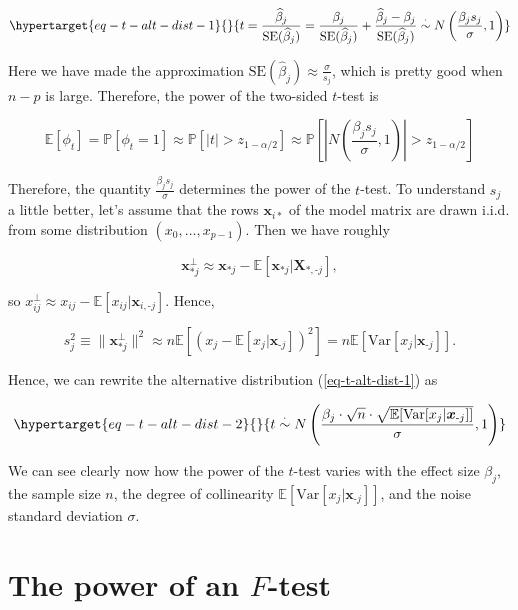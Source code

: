 \documentclass[
  11pt,
  letterpaper,
  oneside]{book}
\theoremstyle{definition}
\theoremstyle{plain}
\theoremstyle{plain}
\theoremstyle{plain}
\theoremstyle{remark}
\begin{document}
\begin{equation}\protect\hypertarget{eq-t-alt-dist-1}{}{
t = \frac{\widehat \beta_j}{\text{SE}(\widehat \beta_j)} = \frac{\beta_j}{\text{SE}(\widehat \beta_j)} + \frac{\widehat \beta_j - \beta_j}{\text{SE}(\widehat \beta_j)} \overset{\cdot}{\sim} N\left(\frac{\beta_j s_j}{\sigma}, 1\right)
}\label{eq-t-alt-dist-1}\end{equation}

Here we have made the approximation
\(\text{SE}(\widehat \beta_j) \approx \frac{\sigma}{s_j}\), which is
pretty good when \(n-p\) is large. Therefore, the power of the two-sided
\(t\)-test is

\[
\mathbb{E}[\phi_t] = \mathbb{P}[\phi_t = 1] \approx \mathbb{P}[|t| > z_{1-\alpha/2}] \approx \mathbb{P}\left[\left|N\left(\frac{\beta_j s_j}{\sigma}, 1\right)\right| > z_{1-\alpha/2}\right]
\]

Therefore, the quantity \(\frac{\beta_j s_j}{\sigma}\) determines the
power of the \(t\)-test. To understand \(s_j\) a little better, let's
assume that the rows \(\boldsymbol{x}_{i*}\) of the model matrix are
drawn i.i.d. from some distribution \((x_0, \dots, x_{p-1})\). Then we
have roughly

\[
\boldsymbol{x}_{*j}^\perp \approx \boldsymbol{x}_{*j} - \mathbb{E}[\boldsymbol{x}_{*j}|\boldsymbol{X}_{*, \text{-}j}],
\]

so
\(x_{ij}^\perp \approx x_{ij} - \mathbb{E}[x_{ij}|\boldsymbol{x}_{i,\text{-}j}]\).
Hence,

\[
s_j^2 \equiv \|\boldsymbol{x}_{*j}^\perp\|^2 \approx n\mathbb{E}[(x_j-\mathbb{E}[x_j|\boldsymbol{x}_{\text{-}j}])^2] = n\mathbb{E}[\text{Var}[x_j|\boldsymbol{x}_{\text{-}j}]].
\]

Hence, we can rewrite the alternative distribution
(\ref{eq-t-alt-dist-1}) as

\begin{equation}\protect\hypertarget{eq-t-alt-dist-2}{}{
t \overset{\cdot}{\sim} N\left(\frac{\beta_j \cdot \sqrt{n} \cdot \sqrt{\mathbb{E}[\text{Var}[x_j|\boldsymbol{x}_{\text{-}j}]]}}{\sigma}, 1\right)
}\label{eq-t-alt-dist-2}\end{equation}

We can see clearly now how the power of the \(t\)-test varies with the
effect size \(\beta_j\), the sample size \(n\), the degree of
collinearity \(\mathbb{E}[\text{Var}[x_j|\boldsymbol{x}_{\text{-}j}]]\),
and the noise standard deviation \(\sigma\).

\hypertarget{the-power-of-an-f-test}{%
\section{\texorpdfstring{The power of an
\(F\)-test}{The power of an F-test}}\label{the-power-of-an-f-test}}
\end{document}
